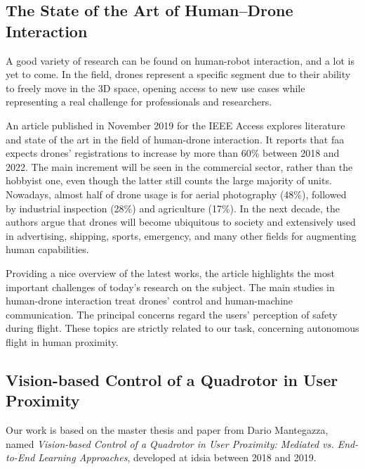 \subsection{The State of the Art of Human–Drone Interaction}
\label{subsec:human-drone-sota}

A good variety of research can be found on human-robot interaction, and a lot is yet to come. In the field, drones represent a specific segment due to their ability to freely move in the 3D space, opening access to new use cases while representing a real challenge for professionals and researchers.

An article published in November 2019 for the IEEE Access \cite{human-drone-sota} explores literature and state of the art in the field of human-drone interaction. It reports that \gls{faa} expects drones' registrations to increase by more than 60\% between 2018 and 2022. The main increment will be seen in the commercial sector, rather than the hobbyist one, even though the latter still counts the large majority of units. Nowadays, almost half of drone usage is for aerial photography (48\%), followed by industrial inspection (28\%) and agriculture (17\%). In the next decade, the authors argue that drones will become ubiquitous to society and extensively used in advertising, shipping, sports, emergency, and many other fields for augmenting human capabilities.

Providing a nice overview of the latest works, the article highlights the most important challenges of today's research on the subject. The main studies in human-drone interaction treat drones' control and human-machine communication. The principal concerns regard the users' perception of safety during flight. These topics are strictly related to our task, concerning autonomous flight in human proximity.



\subsection{Vision-based Control of a Quadrotor in User Proximity}
\label{subsec:sota-dario}

Our work is based on the master thesis \cite{mantegazza2018thesis} and paper \cite{mantegazza2019visionbased} from Dario Mantegazza, named \textit{Vision-based Control of a Quadrotor in User Proximity: Mediated vs. End-to-End Learning Approaches}, developed at \gls{idsia} between 2018 and 2019.

\medskip

